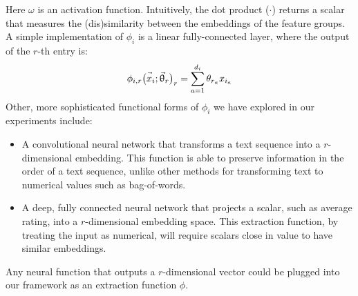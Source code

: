 \documentclass{article}
\newcommand{\vect}[1]{\vec{#1}}
\newcommand{\dotp}{\boldsymbol{\cdot} }
\begin{document}
Here $\omega$ is an activation function.
Intuitively, the dot product ($\dotp$) returns a scalar that measures the (dis)similarity between the embeddings of the feature groups.
A simple  implementation of $\phi_i$ is a linear fully-connected layer, where the output of the $r$-th entry is:
\begin{equation}
\label{eq:fully_connected}
\phi_{i,r}\bigl( \vect{x\vphantom{\theta}}_i; \vect{\uptheta}_r\bigr )_r= \sum_{a=1}^{d_i}  \theta_{r_a} x_{i_a}
\end{equation}
Other, more sophisticated functional forms of $\phi_i$ we have explored in our experiments include:
\begin{itemize}
\item A convolutional neural network that transforms a text sequence into a $r$-dimensional embedding. This function is able to preserve information in the order of a text sequence, unlike other methods for transforming text to numerical values such as bag-of-words.
\item A deep, fully connected neural network that projects a scalar, such as average rating, into a $r$-dimensional embedding space. This extraction function, by treating the input as numerical, will require scalars close in value to have similar embeddings.
\end{itemize}
Any neural function that outputs a $r$-dimensional vector could be plugged into our framework as an extraction function $\phi$.
\end{document}
